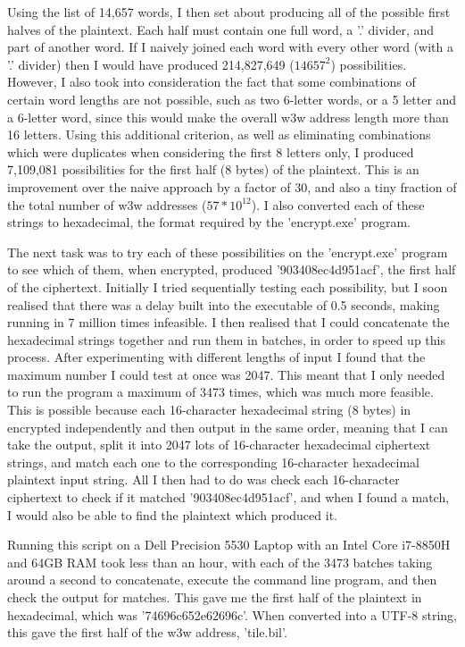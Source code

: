 \documentclass[a4paper, 11pt]{article}
\begin{document}
Using the list of 14,657 words, I then set about producing all of the possible first halves of the plaintext. 
Each half must contain one full word, a '.' divider, and part of another word. 
If I naively joined each word with every other word (with a '.' divider) then I would have produced 214,827,649 ($14657^2$) possibilities. 
However, I also took into consideration the fact that some combinations of certain word lengths are not possible, 
such as two 6-letter words, or a 5 letter and a 6-letter word, since this would make the overall w3w address length more than 16 letters. 
Using this additional criterion, as well as eliminating combinations which were duplicates when considering the first 8 letters only, 
I produced 7,109,081 possibilities for the first half (8 bytes) of the plaintext. 
This is an improvement over the naive approach by a factor of 30, 
and also a tiny fraction of the total number of w3w addresses ($57*10^{12}$). 
I also converted each of these strings to hexadecimal, the format required by the 'encrypt.exe' program. 

The next task was to try each of these possibilities on the 'encrypt.exe' program to see which of them, when encrypted, 
produced '903408ec4d951acf', the first half of the ciphertext. 
Initially I tried sequentially testing each possibility, but I soon realised that there was a delay built into the executable of 0.5 seconds, 
making running in 7 million times infeasible. 
I then realised that I could concatenate the hexadecimal strings together and run them in batches, in order to speed up this process. 
After experimenting with different lengths of input I found that the maximum number I could test at once was 2047. 
This meant that I only needed to run the program a maximum of 3473 times, which was much more feasible. 
This is possible because each 16-character hexadecimal string (8 bytes) in encrypted independently and then output in the same order, 
meaning that I can take the output, split it into 2047 lots of 16-character hexadecimal ciphertext strings, 
and match each one to the corresponding 16-character hexadecimal plaintext input string. 
All I then had to do was check each 16-character ciphertext to check if it matched '903408ec4d951acf', 
and when I found a match, I would also be able to find the plaintext which produced it. 

Running this script on a Dell Precision 5530 Laptop with an Intel Core i7-8850H and 64GB RAM took less than an hour, 
with each of the 3473 batches taking around a second to concatenate, execute the command line program, and then check the output for matches. 
This gave me the first half of the plaintext in hexadecimal, which was '74696c652e62696c'. 
When converted into a UTF-8 string, this gave the first half of the w3w address, 'tile.bil'. 
\end{document}
